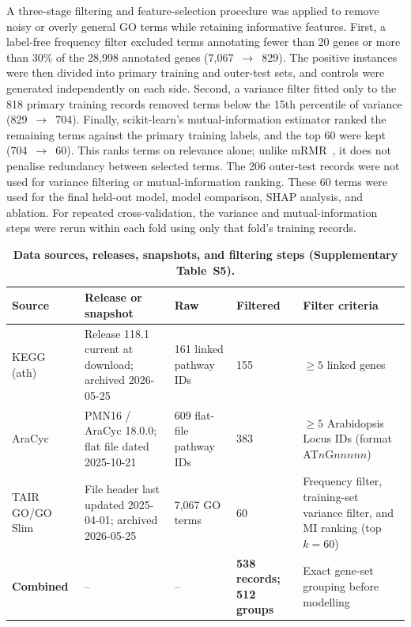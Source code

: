 \documentclass[12pt,letterpaper,oneside,openany]{book}
\begin{document}
A three-stage filtering and feature-selection procedure was applied to remove noisy or overly general GO terms while retaining informative features. First, a label-free frequency filter excluded terms annotating fewer than 20 genes or more than 30\% of the 28,998 annotated genes (7,067~$\rightarrow$~829). The positive instances were then divided into primary training and outer-test sets, and controls were generated independently on each side. Second, a variance filter fitted only to the 818 primary training records removed terms below the 15th percentile of variance (829~$\rightarrow$~704). Finally, scikit-learn's mutual-information estimator \citep{pedregosa2011scikit} ranked the remaining terms against the primary training labels, and the top 60 were kept (704~$\rightarrow$~60). This ranks terms on relevance alone; unlike mRMR~\citep{dingpeng2003}, it does not penalise redundancy between selected terms. The 206 outer-test records were not used for variance filtering or mutual-information ranking. These 60 terms were used for the final held-out model, model comparison, SHAP analysis, and ablation. For repeated cross-validation, the variance and mutual-information steps were rerun within each fold using only that fold's training records.



\begin{table}[H]
\centering
\caption{\textbf{Data sources, releases, snapshots, and filtering steps
(Supplementary Table~S5).}}
\label{tab:s5_data}
\renewcommand{\arraystretch}{1.18}
\small
\begin{tabularx}{\textwidth}{L{2.2cm}L{3.0cm}L{2.4cm}L{1.6cm}X}
\toprule
\textbf{Source} & \textbf{Release or snapshot} & \textbf{Raw} & \textbf{Filtered} & \textbf{Filter criteria} \\
\midrule
KEGG (ath)   & Release 118.1 current at download; archived 2026-05-25 & 161 linked pathway IDs & 155 & $\geq5$ linked genes \\
AraCyc       & PMN16 / AraCyc 18.0.0; flat file dated 2025-10-21 & 609 flat-file pathway IDs & 383 & $\geq5$ Arabidopsis Locus IDs (format AT$n$G$nnnnn$) \\
TAIR GO/GO Slim & File header last updated 2025-04-01; archived 2026-05-25 & 7,067 GO terms & 60 & Frequency filter, training-set variance filter, and MI ranking (top $k=60$) \\
\midrule
\textbf{Combined} & -- & -- & \textbf{538 records; 512 groups} & Exact gene-set grouping before modelling \\
\bottomrule
\end{tabularx}
\end{table}
\end{document}
